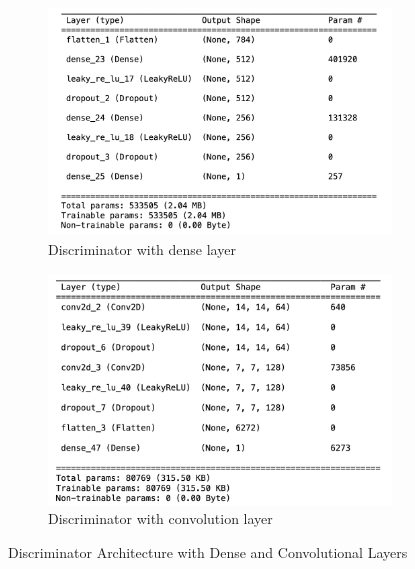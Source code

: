 \begin{figure}[H]
    \centering
    \begin{subfigure}[b]{0.45\linewidth}
        \centering
        \includegraphics[width=\linewidth]{./Images/discriminator_dense.jpg}
        \caption{Discriminator with dense layer}
        \label{fig:Dense}
    \end{subfigure}
    \hspace{0.05\linewidth}
    \begin{subfigure}[b]{0.45\linewidth}
        \centering
        \includegraphics[width=\linewidth]{./Images/discriminator_cnn.jpg}
        \caption{Discriminator with convolution layer}
        \label{fig:Conv2D Transpose}
    \end{subfigure}
    \caption{Discriminator Architecture with Dense and Convolutional Layers}
    \label{fig:combined}
\end{figure}


